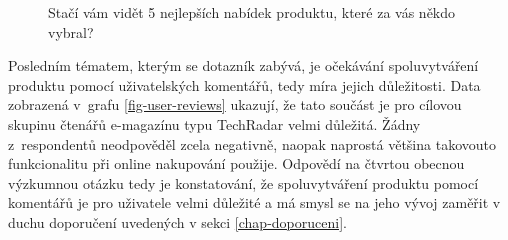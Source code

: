 \documentclass[12pt,oneside,openany]{fithesis}
\begin{document}
\begin{figure}[hbt]
    \hypertarget{fig-top-5}{}%
    \begin{center}

\data



\caption[{Stačí vám vidět 5 nejlepších nabídek produktu?}]{Stačí vám vidět 5 nejlepších nabídek produktu, které za vás někdo vybral?}
\label{fig-top-5}
                
\end{center}
\end{figure}

            Posledním tématem, kterým se dotazník zabývá, je 
očekávání spoluvytváření produktu pomocí uživatelských komentářů, 
tedy míra jejich důležitosti. Data zobrazená v~grafu 
\hyperlink{fig-user-reviews}{{\ref{fig-user-reviews}}} ukazují, že tato 
součást je pro cílovou skupinu čtenářů e-magazínu typu TechRadar velmi 
důležitá. Žádny z~respondentů neodpověděl zcela negativně, naopak 
naprostá většina takovouto funkcionalitu při online nakupování použije.
Odpovědí na čtvrtou obecnou výzkumnou otázku tedy je
konstatování, že spoluvytváření produktu pomocí komentářů je pro uživatele
velmi důležité a má smysl se na jeho vývoj zaměřit v duchu 
doporučení uvedených v sekci \hyperlink{chap-doporuceni}{{\ref{chap-doporuceni}}}.
\end{document}
